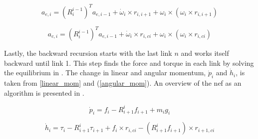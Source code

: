 \begin{equation}\label{a_end}
a_{e,i} = \left ( R^{i-1}_i \right )^T a_{e,i-1} + \dot{\omega}_i \times r_{i,i+1}+\omega_i \times \left ( \omega_i \times r_{i,i+1} \right )
\end{equation}

\begin{equation}\label{a_center}
a_{c,i} = \left ( R^{i-1}_i \right )^T a_{e,i-1} + \dot{\omega}_i \times r_{i,ci}+\omega_i \times \left ( \omega_i \times r_{i,ci} \right )
\end{equation}

Lastly, the backward recursion starts with the last link $n$ and works itself backward until link 1. This step finds the force and torque in each link by solving the equilibrium in . The change in linear and angular momentum, $\dot{p}_i$ and $\dot{h}_i$, is taken from \eqref{linear_mom} and (\ref{angular_mom}). An overview of the \gls{nef} as an algorithm is presented in .

\begin{equation}\label{linear_equi}
\dot{p}_i = f_i - R^i_{i+1} f_{i+1} + m_i g_i
\end{equation}

\begin{equation}\label{angular_equi}
\dot{h}_i = \tau_i - R^i_{i+1}\tau_{i+1} + f_i \times r_{i,ci}-\left ( R^i_{i+1}f_{i+1} \right ) \times r_{i+1,ci}
\end{equation}







